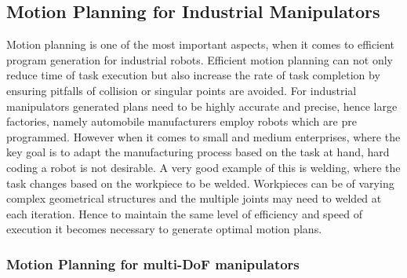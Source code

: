 \subsection{Motion Planning for Industrial Manipulators}
Motion planning is one of the most important aspects, when it comes to efficient program generation for industrial robots. Efficient motion planning can not only reduce time of task execution but also increase the rate of task completion by ensuring pitfalls of collision or singular points are avoided. For industrial manipulators generated plans need to be highly accurate and precise, hence large factories, namely automobile manufacturers employ robots which are pre programmed. However when it comes to small and medium enterprises, where the key goal is to adapt the manufacturing process based on the task at hand, hard coding a robot is not desirable. A very good example of this is welding, where the task changes based on the workpiece to be welded. Workpieces can be of varying complex geometrical structures and the multiple joints may need to welded at each iteration. Hence to maintain the same level of efficiency and speed of execution it becomes necessary to generate optimal motion plans.  

\subsubsection{Motion Planning for multi-DoF manipulators}

